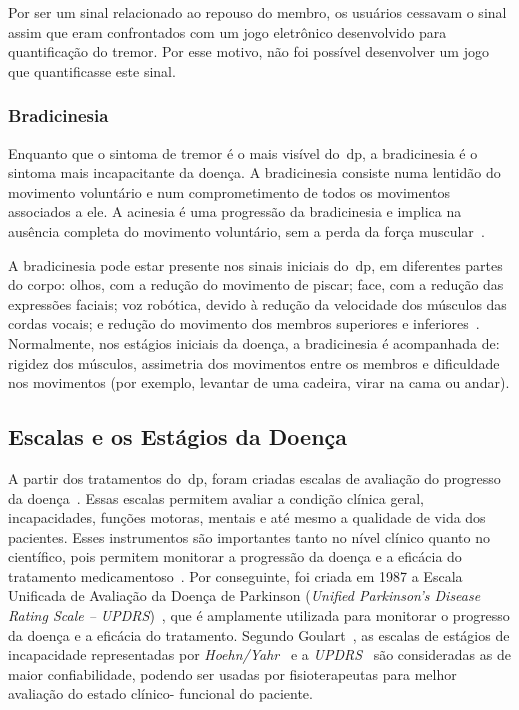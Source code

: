 Por ser um sinal relacionado ao repouso do membro, os usuários cessavam o sinal assim que eram confrontados com um jogo eletrônico desenvolvido para quantificação do tremor. Por esse motivo, não foi possível desenvolver um jogo que quantificasse este sinal.


\subsubsection{Bradicinesia}\label{section:analise_bradicinesia}
Enquanto que o sintoma de tremor é o mais visível do~\ac{dp}, a bradicinesia é o sintoma mais incapacitante da doença. A bradicinesia consiste numa lentidão do movimento voluntário e num comprometimento de todos os movimentos associados a ele. A acinesia é uma progressão da bradicinesia e implica na ausência completa do movimento voluntário, sem a perda da força muscular~\cite{do2007parkinson}.

A bradicinesia pode estar presente nos sinais iniciais do~\ac{dp}, em diferentes partes do corpo: olhos, com a redução do movimento de piscar; face, com a redução das expressões faciais; voz robótica, devido à redução da velocidade dos músculos das cordas vocais; e redução do movimento dos membros superiores e inferiores~\cite{do2007parkinson}. Normalmente, nos estágios iniciais da doença, a bradicinesia é acompanhada de: rigidez dos músculos, assimetria dos movimentos entre os membros e dificuldade nos movimentos (por exemplo, levantar de uma cadeira, virar na cama ou andar).  

\subsection{Escalas e os Estágios da Doença}\label{section:escalas_avaliacao}
A partir dos tratamentos do~\ac{dp}, foram criadas escalas de avaliação do progresso da doença~\cite{updrs87,Hoehn_Yahr_2001}. Essas escalas permitem avaliar a condição clínica geral, incapacidades, funções motoras, mentais e até mesmo a qualidade de vida dos pacientes. Esses instrumentos são importantes tanto no nível clínico quanto no científico, pois permitem monitorar a progressão da doença e a eficácia do tratamento medicamentoso~\cite{updrs87,goul05}.  Por conseguinte, foi criada em 1987 a Escala Unificada de Avaliação da  Doença de Parkinson (\textit{Unified Parkinson’s Disease Rating Scale – UPDRS})~\cite{updrs87}, que é amplamente utilizada para monitorar o progresso da doença e a eficácia do tratamento. Segundo Goulart~\cite{goul05}, as escalas de estágios de incapacidade representadas por \textit{Hoehn/Yahr}~\cite{Hoehn_Yahr_2001} e a \textit{UPDRS}~\cite{updrs87} são consideradas as de maior confiabilidade, podendo ser usadas por fisioterapeutas para melhor avaliação do estado clínico-
funcional do  paciente.%


